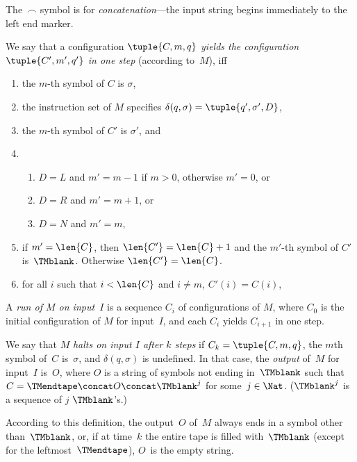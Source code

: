 \documentclass[../../../include/open-logic-section]{subfiles}
\begin{document}
\begin{explain}
The~$\frown$ symbol is for \emph{concatenation}---the input string
begins immediately to the left end marker.
\end{explain}

\begin{defn}
We say that a configuration $\tuple{C, m, q}$ \emph{yields the
configuration $\tuple{C', m', q'}$ in one step} (according to~$M$),
iff
\begin{enumerate}
\item the $m$-th symbol of $C$ is $\sigma$,
\item the instruction set of $M$ specifies $\delta(q, \sigma) =
  \tuple{q', \sigma', D}$,
\item the $m$-th symbol of $C'$ is $\sigma'$, and 
\item
\begin{enumerate}
\item $D = L$ and $m' = m - 1$ if $m>0$, otherwise $m'=0$, or
\item $D = R$ and $m' = m + 1$, or
\item $D = N$ and $m' = m$,
\end{enumerate}
\item if $m' = \len{C}$, then $\len{C'} = \len{C} + 1$ and the $m'$-th
  symbol of $C'$ is~$\TMblank$. Otherwise $\len{C'}=\len{C}$.
\item for all $i$ such that $i < \len{C}$ and $i \neq m$, $C'(i) = C(i)$,
\end{enumerate}
\end{defn}

\begin{defn}
A \emph{run of $M$ on input~$I$} is a sequence $C_i$ of configurations
of $M$, where $C_0$ is the initial configuration of $M$ for input~$I$,
and each $C_i$ yields $C_{i+1}$ in one step.

We say that $M$ \emph{halts on input $I$ after $k$ steps} if $C_k =
\tuple{C, m, q}$, the $m$th symbol of~$C$ is~$\sigma$, and $\delta(q,
\sigma)$ is undefined.  In that case, the \emph{output} of~$M$ for
input~$I$ is~$O$, where $O$ is a string of symbols not ending
in~$\TMblank$ such that $C = \TMendtape \concat O \concat \TMblank^j$
for some~$j \in \Nat$. ($\TMblank^j$ is a sequence of $j$ $\TMblank$'s.)
\end{defn}

\begin{explain}
According to this definition, the output~$O$ of~$M$ always 
ends in a symbol other than~$\TMblank$, or, if at time~$k$ the entire
tape is filled with~$\TMblank$ (except for the leftmost~$\TMendtape$),
$O$~is the empty string.
\end{explain}
\end{document}

